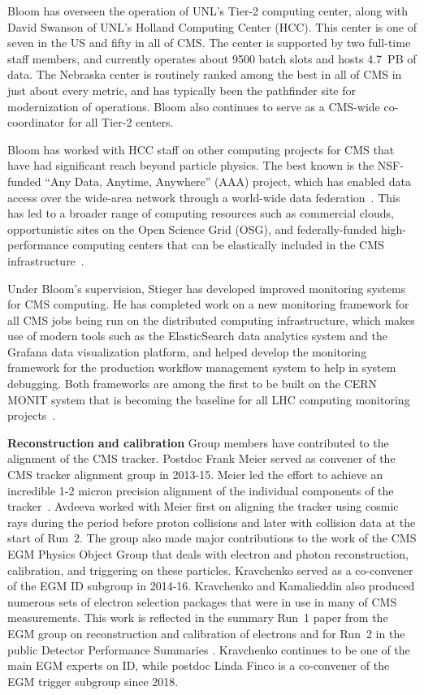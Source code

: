 Bloom has overseen the operation of UNL's Tier-2 computing center, along with David Swanson of UNL's Holland Computing Center (HCC). This center is one of seven in the US and fifty in all of CMS. The center is supported by two full-time staff members, and currently operates about 9500 batch slots and hosts 4.7~PB of data. The Nebraska center is routinely ranked among the best in all of CMS in just about every metric, and has typically been the pathfinder site for modernization of operations. Bloom also continues to serve as a CMS-wide co-coordinator for all Tier-2 centers.

Bloom has worked with HCC staff on other computing projects for CMS that have had significant reach beyond particle physics.  The best known is the NSF-funded ``Any Data, Anytime, Anywhere'' (AAA) project, which has enabled data access over the wide-area network through a world-wide data federation~\cite{bib:AAA}.  This has led to a broader range of computing resources such as commercial clouds, opportunistic sites on the Open Science Grid (OSG), and federally-funded high-performance computing centers that can be elastically included in the CMS infrastructure~\cite{bib:hepcloud}.

Under Bloom's supervision, Stieger has developed improved monitoring systems for CMS computing. He has completed work on a new monitoring framework for all CMS jobs being run on the distributed computing infrastructure, which makes use of modern tools such as the ElasticSearch data analytics system and the Grafana data visualization platform, and helped develop the monitoring framework for the production workflow management system to help in system debugging.  Both frameworks are among the first to be built on the CERN MONIT system that is becoming the baseline for all LHC computing monitoring projects~\cite{bib:MONIT}.

{\bf Reconstruction and calibration}
Group members have contributed to the alignment of the CMS tracker.  Postdoc Frank Meier served as convener of the CMS tracker alignment group in 2013-15.  Meier led the effort to achieve an incredible 1-2 micron precision alignment of the individual components of the  tracker~\cite{bib:alignment}.  Avdeeva worked with Meier first on aligning the tracker using cosmic rays during the period before proton collisions and later with collision data at the start of Run~2. The group also made major contributions to the work of the CMS EGM Physics Object Group that deals with electron and photon reconstruction, calibration, and triggering on these particles. Kravchenko served as a co-convener of the EGM ID subgroup in 2014-16. Kravchenko and Kamalieddin also produced numerous sets of electron selection packages that were in use in many of CMS measurements. This work is reflected in the summary Run~1 paper from the EGM group on reconstruction and calibration of electrons \cite{bib:EGM-Run1} and for Run~2 in the public Detector Performance Summaries \cite{bib:EGM-Run2-DP}. Kravchenko continues to be one of the main EGM experts on ID, while postdoc Linda Finco is a co-convener of the EGM trigger subgroup since 2018.

